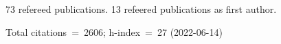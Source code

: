 73 refereed publications. 13 refeered publications as first author.

Total citations~=~2606; h-index~=~27 (2022-06-14)